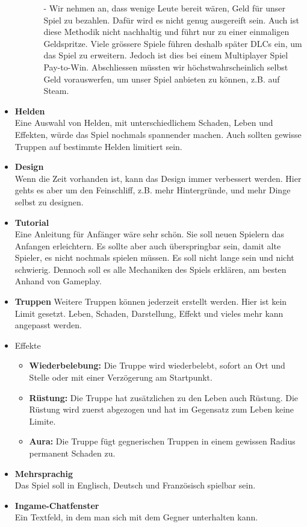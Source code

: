 \begin{itemize}
\begin{enumerate}
\begin{itemize}
            \item[-] Wir nehmen an, dass wenige Leute bereit wären, Geld für unser Spiel zu bezahlen.
                    Dafür wird es nicht genug ausgereift sein.
                    Auch ist diese Methodik nicht nachhaltig und führt nur zu einer einmaligen Geldspritze.
                    Viele grössere Spiele führen deshalb später
                    DLCs ein, um das Spiel zu erweitern.
                    Jedoch ist dies bei einem Multiplayer Spiel Pay-to-Win.
                    Abschliessen müssten wir höchstwahrscheinlich selbst Geld vorauswerfen, um unser Spiel anbieten zu können, z.B. auf Steam.
        \end{itemize}
        
    \end{enumerate}
    \item \textbf{Helden} \\
        Eine Auswahl von Helden, mit unterschiedlichem Schaden, Leben und Effekten, würde das Spiel nochmals spannender machen. Auch sollten gewisse Truppen auf bestimmte Helden limitiert sein. 
    \item \textbf{Design} \\
        Wenn die Zeit vorhanden ist, kann das Design immer verbessert werden. Hier gehts es aber um den Feinschliff, z.B. mehr Hintergründe, und mehr Dinge selbst zu designen.
    \item \textbf{Tutorial} \\
        Eine Anleitung für Anfänger wäre sehr schön. Sie soll neuen Spielern das Anfangen erleichtern. Es sollte aber auch überspringbar sein,
        damit alte Spieler, es nicht nochmals spielen müssen. Es soll nicht lange sein und nicht schwierig. Dennoch soll es alle Mechaniken des Spiels
        erklären, am besten Anhand von Gameplay.
    \item \textbf{Truppen}
        Weitere Truppen können jederzeit erstellt werden. Hier ist kein Limit gesetzt. Leben, Schaden, Darstellung, Effekt und vieles mehr kann angepasst werden.
    \item Effekte
    \begin{itemize}
        \item \textbf{Wiederbelebung:}
            Die Truppe wird wiederbelebt, sofort an Ort und Stelle oder mit einer Verzögerung am Startpunkt.
        \item \textbf{Rüstung:}
            Die Truppe hat zusätzlichen zu den Leben auch Rüstung. Die Rüstung wird zuerst abgezogen und hat im Gegensatz zum Leben keine Limite.
        \item \textbf{Aura:}
            Die Truppe fügt gegnerischen Truppen in einem gewissen Radius permanent Schaden zu.
    \end{itemize}
    \item \textbf{Mehrsprachig} \\
        Das Spiel soll in Englisch, Deutsch und Französisch spielbar sein.
    \item \textbf{Ingame-Chatfenster}\\
        Ein Textfeld, in dem man sich mit dem Gegner unterhalten kann.
\end{itemize}

